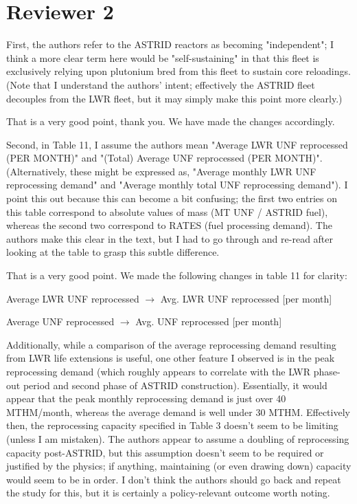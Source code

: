 \documentclass[answers,11pt]{exam}
\begin{document}
\section*{Reviewer 2}
\begin{questions}
    \question First, the authors refer to the ASTRID reactors as becoming "independent"; I think a more clear term here would be "self-sustaining" in that this fleet is exclusively relying upon plutonium bred from this fleet to sustain core reloadings. (Note that I understand the authors' intent; effectively the ASTRID fleet decouples from the LWR fleet, but it may simply make this point more clearly.)

    \begin{solution}
    That is a very good point, thank you. We have made the changes
    accordingly.
    \end{solution}

    \question Second, in Table 11, I assume the authors mean "Average LWR UNF reprocessed (PER MONTH)" and "(Total) Average UNF reprocessed (PER MONTH)". (Alternatively, these might be expressed as, "Average monthly LWR UNF reprocessing demand" and "Average monthly total UNF reprocessing demand"). I point this out because this can become a bit confusing; the first two entries on this table correspond to absolute values of mass (MT UNF / ASTRID fuel), whereas the second two correspond to RATES (fuel processing demand). The authors make this clear in the text, but I had to go through and re-read after looking at the table to grasp this subtle difference.

    \begin{solution}
    That is a very good point. We made the following changes
    in table 11 for clarity:
    
    Average LWR UNF reprocessed $\rightarrow$ Avg. LWR UNF reprocessed [per month]

    Average UNF reprocessed $\rightarrow$ Avg. UNF reprocessed [per month]

    \end{solution}

    \question Additionally, while a comparison of the average reprocessing
    demand resulting from LWR life extensions is useful, one other
     feature I observed is in the peak reprocessing demand (which roughly appears to correlate 
     with the LWR phase-out period and second phase of ASTRID construction). Essentially,
    it would appear that the peak monthly reprocessing demand is just over 40 MTHM/month,
    whereas the average demand is well under 30 MTHM. Effectively then, the reprocessing 
    capacity specified in Table 3 doesn't seem to be limiting (unless I am mistaken). The
    authors appear to assume a doubling of reprocessing capacity post-ASTRID, but this 
    assumption doesn't seem to be required or justified by the physics; if anything,
    maintaining (or even drawing down) capacity would seem to be in order. I don't think
    the authors should go back and repeat the study for this, but it is certainly a
    policy-relevant outcome worth noting.


\end{questions}
\end{document}
